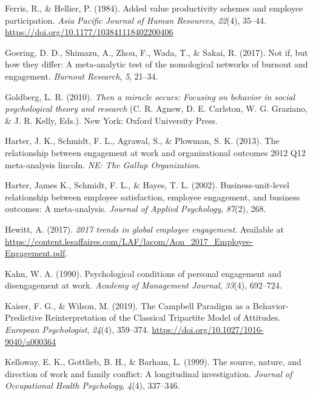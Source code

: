 \documentclass[
  man]{apa6}
\newlength{\cslhangindent}
\newlength{\cslentryspacingunit} %
\newenvironment{CSLReferences}[2] %
 {%
  \setlength{\parindent}{0pt}
  \ifodd #1
  \let\oldpar\par
  \def\par{\hangindent=\cslhangindent\oldpar}
  \fi
  \setlength{\parskip}{#2\cslentryspacingunit}
 }%
 {}
\begin{document}
\begin{CSLReferences}{1}{0}
\leavevmode{}%
Ferris, R., \& Hellier, P. (1984). Added value productivity schemes and employee participation. \emph{Asia Pacific Journal of Human Resources}, \emph{22}(4), 35--44. \url{https://doi.org/10.1177/103841118402200406}

\leavevmode{}%
Goering, D. D., Shimazu, A., Zhou, F., Wada, T., \& Sakai, R. (2017). Not if, but how they differ: A meta-analytic test of the nomological networks of burnout and engagement. \emph{Burnout Research}, \emph{5}, 21--34.

\leavevmode{}%
Goldberg, L. R. (2010). \emph{Then a miracle occurs: Focusing on behavior in social psychological theory and research} (C. R. Agnew, D. E. Carlston, W. G. Graziano, \& J. R. Kelly, Eds.). New York: Oxford University Press.

\leavevmode{}%
Harter, J. K., Schmidt, F. L., Agrawal, S., \& Plowman, S. K. (2013). The relationship between engagement at work and organizational outcomes 2012 Q12 meta-analysis lincoln. \emph{{NE}: The Gallup Organization}.

\leavevmode{}%
Harter, James K., Schmidt, F. L., \& Hayes, T. L. (2002). Business-unit-level relationship between employee satisfaction, employee engagement, and business outcomes: A meta-analysis. \emph{Journal of Applied Psychology}, \emph{87}(2), 268.

\leavevmode{}%
Hewitt, A. (2017). \emph{2017 trends in global employee engagement}. Available at \url{https://content.lesaffaires.com/LAF/lacom/Aon_2017_Employee-Engagement.pdf}.

\leavevmode{}%
Kahn, W. A. (1990). Psychological conditions of personal engagement and disengagement at work. \emph{Academy of Management Journal}, \emph{33}(4), 692--724.

\leavevmode{}%
Kaiser, F. G., \& Wilson, M. (2019). The {Campbell} {Paradigm} as a {Behavior}-{Predictive} {Reinterpretation} of the {Classical} {Tripartite} {Model} of {Attitudes}. \emph{European Psychologist}, \emph{24}(4), 359--374. \url{https://doi.org/10.1027/1016-9040/a000364}

\leavevmode{}%
Kelloway, E. K., Gottlieb, B. H., \& Barham, L. (1999). The source, nature, and direction of work and family conflict: A longitudinal investigation. \emph{Journal of Occupational Health Psychology}, \emph{4}(4), 337--346.


\end{CSLReferences}
\end{document}
